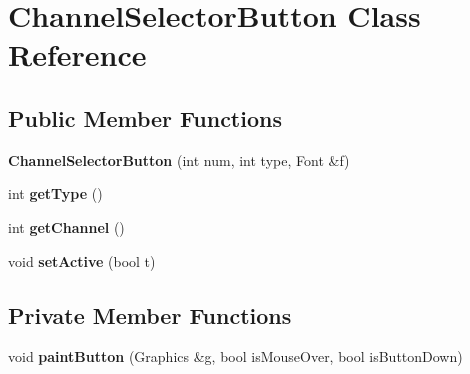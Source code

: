 \hypertarget{classChannelSelectorButton}{\section{Channel\-Selector\-Button Class Reference}
\label{classChannelSelectorButton}
}
\subsection*{Public Member Functions}
\begin{DoxyCompactItemize}
\item 
\hypertarget{classChannelSelectorButton_a603b11b50a5d7d0ab0584d96c5df5af6}{{\bfseries Channel\-Selector\-Button} (int num, int type, Font \&f)}\label{classChannelSelectorButton_a603b11b50a5d7d0ab0584d96c5df5af6}

\item 
\hypertarget{classChannelSelectorButton_aede9669c1eb850ea9fad5951191a1395}{int {\bfseries get\-Type} ()}\label{classChannelSelectorButton_aede9669c1eb850ea9fad5951191a1395}

\item 
\hypertarget{classChannelSelectorButton_a72a60be5744bd2b48c73d22ba8a521ef}{int {\bfseries get\-Channel} ()}\label{classChannelSelectorButton_a72a60be5744bd2b48c73d22ba8a521ef}

\item 
\hypertarget{classChannelSelectorButton_ab7e744dcfc1f0d55ab6181b4efe67cd7}{void {\bfseries set\-Active} (bool t)}\label{classChannelSelectorButton_ab7e744dcfc1f0d55ab6181b4efe67cd7}

\end{DoxyCompactItemize}
\subsection*{Private Member Functions}
\begin{DoxyCompactItemize}
\item 
\hypertarget{classChannelSelectorButton_a186afb04c09259eda02e7b71e9621048}{void {\bfseries paint\-Button} (Graphics \&g, bool is\-Mouse\-Over, bool is\-Button\-Down)}\label{classChannelSelectorButton_a186afb04c09259eda02e7b71e9621048}

\end{DoxyCompactItemize}
